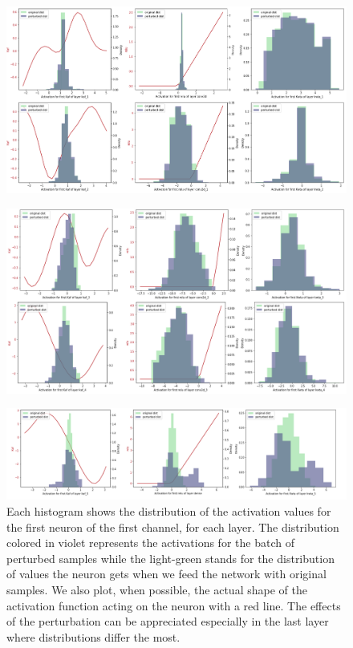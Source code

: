 \documentclass[LaM,binding=0.6cm]{./packages/sapthesis/sapthesis}
\begin{document}
        \begin{figure}[h]
            \centering
            \includegraphics[width=1.1\textwidth]{actdist11.png}
            \label{fig:actdist11}
        \end{figure}
        \begin{figure}[t]
            \centering
            \includegraphics[width=1.1\textwidth]{actdist12.png}
            \label{fig:actdist12}
        \end{figure}
        \begin{figure}[t!]
            \centering
            \includegraphics[width=1.1\textwidth]{actdist13.png}
            \caption{Each histogram shows the distribution of the activation values for the first neuron of the first channel, for each layer.
            The distribution colored in violet represents the activations for the batch of perturbed samples while the light-green stands for the 
            distribution of values the neuron gets when we feed the network with original samples. We also plot, when possible, the actual shape of the activation function acting 
            on the neuron with a red line. The effects of the perturbation can be appreciated especially in the last layer where distributions differ the most.}
            \label{fig:actdist13}
        \end{figure}
\end{document}
